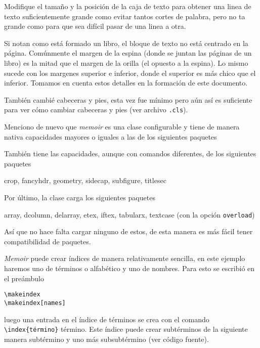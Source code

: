 Modifique el tamaño y la posición de la caja de texto para obtener una linea de texto suficientemente grande como evitar tantos cortes de palabra, pero no ta grande como para que sea difícil pasar de una linea a otra.

Si notan como está formado un libro, el bloque de texto no está centrado
en la página. Comúnmente el margen de la espina (donde se juntan las
páginas de un libro) es la mitad que el margen de la orilla (el opuesto a
la espina). Lo mismo sucede con los margenes superior e inferior, donde el
superior es más chico que el inferior. Tomamos en cuenta estos detalles en
la formación de este documento.

También cambié cabeceras y pies, esta vez fue mínimo pero aún así es
suficiente para ver cómo cambiar cabeceras y pies (ver archivo \texttt{.cls}).

Menciono de nuevo que \textit{memoir} es una clase configurable y tiene de
manera nativa capacidades mayores o iguales a
las de los siguientes paquetes
\begin{center}
\end{center}
También tiene las capacidades, aunque con comandos diferentes, de los siguientes paquetes
\begin{center}
  crop, fancyhdr, geometry, sidecap, subfigure, titlesec
\end{center}
Por último, la clase carga los siguientes paquetes
\begin{center}
  array, dcolumn, delarray, etex, iftex, tabularx, textcase (con la opción \texttt{overload})
\end{center}
Así que no hace falta cargar ninguno de estos, de esta manera es más fácil
tener compatibilidad de paquetes.

\textit{Memoir} puede crear índices de manera relativamente sencilla, en este ejemplo
haremos uno de términos o alfabético y uno de nombres. Para esto se escribió
en el preámbulo
\begin{flushleft}
  \verb|\makeindex|\\
  \verb|\makeindex[names]|
\end{flushleft}
luego una entrada en el índice de términos se crea con el comando
\verb|\index{término}| término. Este índice puede crear
subtérminos de la siguiente manera subtérmino y
uno más subsubtérmino (ver código
fuente).

